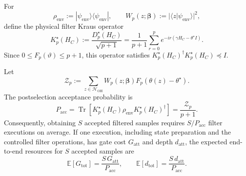 \documentclass[a4paper,unpublished,onecolumn,11pt]{quantumarticle}
\theoremstyle{definition}
\theoremstyle{remark}
\begin{document}
\begin{appendix}
For
\[
\rho_{\mathrm{env}}
:=
|\psi_{\mathrm{env}}\rangle
\langle\psi_{\mathrm{env}}|,
\qquad
W_p(z;\boldsymbol\beta)
:=
|\langle z|\psi_{\mathrm{env}}\rangle|^2,
\]
define the physical filter Kraus operator
\[
K_p^\star(H_C)
:=
\frac{D_p^\star(H_C)}{\sqrt{p+1}}
=
\frac{1}{p+1}
\sum_{r=0}^{p}
e^{-ir(\gamma H_C-\theta^\star I)}.
\]
Since $0\le F_p(\vartheta)\le p+1$, this operator satisfies
$K_p^\star(H_C)^\dagger K_p^\star(H_C)\preceq I$.

Let
\begin{equation}
\label{eq:coherent-normalization}
\mathcal Z_p
:=
\sum_{z\in\mathcal H_{\mathrm{OH}}}
W_p(z;\boldsymbol\beta)
F_p(\theta(z)-\theta^\star).
\end{equation}
The postselection acceptance probability is
\begin{equation}
\label{eq:postselection-acceptance}
P_{\mathrm{acc}}
=
\operatorname{Tr}\!\left[
K_p^\star(H_C)\rho_{\mathrm{env}}
K_p^\star(H_C)^\dagger
\right]
=
\frac{\mathcal Z_p}{p+1}.
\end{equation}
Consequently, obtaining $S$ accepted filtered samples requires
$S/P_{\mathrm{acc}}$ filter executions on average. If one execution,
including state preparation and the controlled filter operations, has
gate cost $G_{\mathrm{att}}$ and depth $d_{\mathrm{att}}$, the expected
end-to-end resources for $S$ accepted samples are
\begin{equation}
\label{eq:accepted-sample-overhead}
\mathbb E[G_{\mathrm{tot}}]
=
\frac{S\,G_{\mathrm{att}}}{P_{\mathrm{acc}}},
\qquad
\mathbb E[d_{\mathrm{tot}}]
=
\frac{S\,d_{\mathrm{att}}}{P_{\mathrm{acc}}}.
\end{equation}


\end{appendix}
\end{document}
